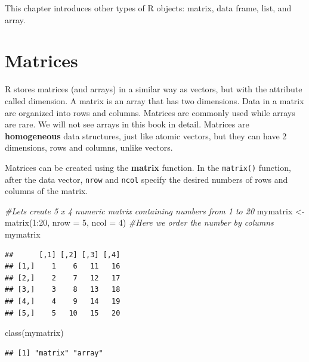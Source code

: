 \documentclass[
]{book}
\newenvironment{Shaded}{\begin{snugshade}}{\end{snugshade}}
\newcommand{\AttributeTok}[1]{\textcolor[rgb]{0.77,0.63,0.00}{#1}}
\newcommand{\CommentTok}[1]{\textcolor[rgb]{0.56,0.35,0.01}{\textit{#1}}}
\newcommand{\DecValTok}[1]{\textcolor[rgb]{0.00,0.00,0.81}{#1}}
\newcommand{\FunctionTok}[1]{\textcolor[rgb]{0.00,0.00,0.00}{#1}}
\newcommand{\NormalTok}[1]{#1}
\newcommand{\OtherTok}[1]{\textcolor[rgb]{0.56,0.35,0.01}{#1}}
\newcommand{\SpecialCharTok}[1]{\textcolor[rgb]{0.00,0.00,0.00}{#1}}
\begin{document}
This chapter introduces other types of R objects: matrix, data frame, list, and array.

\hypertarget{matrices}{%
\section{Matrices}\label{matrices}}

R stores matrices (and arrays) in a similar way as vectors, but with the attribute called dimension. A matrix is an array that has two dimensions. Data in a matrix are organized into rows and columns. Matrices are commonly used while arrays are rare. We will not see arrays in this book in detail. Matrices are \textbf{homogeneous} data structures, just like atomic vectors, but they can have 2 dimensions, rows and columns, unlike vectors.

Matrices can be created using the \textbf{matrix} function. In the \texttt{matrix()} function, after the data vector, \texttt{nrow} and \texttt{ncol} specify the desired numbers of rows and columns of the matrix.

\begin{Shaded}
\begin{Highlighting}[]
\CommentTok{\#Let\textquotesingle{}s create 5 x 4 numeric matrix containing numbers from 1 to 20}
\NormalTok{mymatrix }\OtherTok{\textless{}{-}} \FunctionTok{matrix}\NormalTok{(}\DecValTok{1}\SpecialCharTok{:}\DecValTok{20}\NormalTok{, }\AttributeTok{nrow =} \DecValTok{5}\NormalTok{, }\AttributeTok{ncol =} \DecValTok{4}\NormalTok{)  }\CommentTok{\#Here we order the number by columns}
\NormalTok{mymatrix}
\end{Highlighting}
\end{Shaded}

\begin{verbatim}
##      [,1] [,2] [,3] [,4]
## [1,]    1    6   11   16
## [2,]    2    7   12   17
## [3,]    3    8   13   18
## [4,]    4    9   14   19
## [5,]    5   10   15   20
\end{verbatim}

\begin{Shaded}
\begin{Highlighting}[]
\FunctionTok{class}\NormalTok{(mymatrix)}
\end{Highlighting}
\end{Shaded}

\begin{verbatim}
## [1] "matrix" "array"
\end{verbatim}
\end{document}
